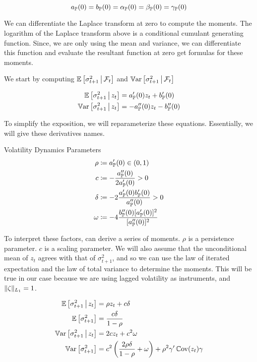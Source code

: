 \documentclass[11pt, letterpaper, twoside, final]{article}
\begin{document}
\begin{equation}
    a_{\mathbb{P}}(0) = b_{\mathbb{P}}(0) = \alpha_{\mathbb{P}}(0) = \beta_{\mathbb{P}}(0) = \gamma_{\mathbb{P}}(0) 
\end{equation}

We can differentiate the Laplace transform at zero to compute the moments.
The logarithm of the Laplace transform above is a conditional cumulant generating function.
Since, we are only using the mean and variance, we can differentiate this function  and evaluate the
resultant function at zero get formulas for these moments.

We start by computing $\operatorname{\mathbb{E}}\left[\sigma^2_{t+1} \,\middle\vert\, \mathcal{F}_t\right]$ and $\operatorname{\mathbb{V}ar}\left[\sigma^2_{t+1} \,\middle\vert\,
\mathcal{F}_t\right]$


\begin{align}
    \operatorname{\mathbb{E}}\left[\sigma^2_{t+1} \,\middle\vert\, z_t \right]  &= a_{\mathbb{P}}'(0) z_t  + b_{\mathbb{P}}'(0) \\
    \operatorname{\mathbb{V}ar}\left[\sigma^2_{t+1} \,\middle\vert\, z_t \right]  &= -a_{\mathbb{P}}''(0) z_t  - b_{\mathbb{P}}''(0) 
\end{align}

To simplify the exposition, we will reparameterize these equations. 
Essentially, we will give these derivatives names.

\begin{defn}{Volatility Dynamics Parameters}
    \begin{align}
        \rho &\coloneqq a_{\mathbb{P}}'(0) \in (0,1) \\
        c &\coloneqq - \frac{a_{\mathbb{P}}''(0)}{2 a_{\mathbb{P}}'(0)} > 0 \\
        \delta &\coloneqq -2 \frac{a_{\mathbb{P}}'(0) b_{\mathbb{P}}'(0)}{a_{\mathbb{P}}''(0)} > 0 \\
        \omega &\coloneqq -4 \frac{b_{\mathbb{P}}''(0) [a_{\mathbb{P}}'(0)]^2}{[a_{\mathbb{P}}''(0)]^2}
    \end{align}
\end{defn}

To interpret these factors, can derive a series of moments. 
$\rho$ is a persistence parameter.
$c$ is a scaling parameter.
We will also assume that the unconditional mean of $z_t$ agrees with that of $\sigma^2_{t+1}$, and so we can use
the law of iterated expectation and the law of total variance to determine the moments.
This will be true in our case because we are using lagged volatility as instruments, and $\lVert\zeta\rVert_{L_1} = 1$.


\begin{align}
    \operatorname{\mathbb{E}}\left[\sigma^2_{t+1} \,\middle\vert\, z_t \right]  &= \rho z_t  + c \delta\\
    \operatorname{\mathbb{E}}\left[\sigma^2_{t+1}\right]  &= \frac{c \delta}{1 - \rho} \\
    \operatorname{\mathbb{V}ar}\left[\sigma^2_{t+1} \,\middle\vert\, z_t \right]  &=  2 c z_t  + c^2 \omega \\
    \operatorname{\mathbb{V}ar}\left[\sigma^2_{t+1} \right]  &=  c^2 \left(\frac{2 \rho \delta}{1 - \rho}  +
\omega \right) + \rho^2 \gamma' \operatorname{\mathbb{C}ov} (z_t) \gamma
\end{align}
\end{document}
